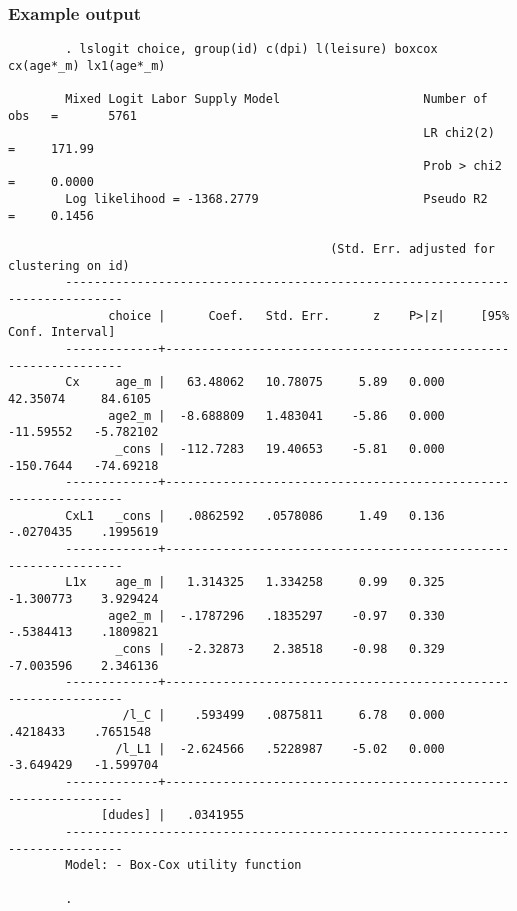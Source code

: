 \documentclass[handout,intlimits]{beamer}
\begin{document}
\begin{frame}[fragile]
\frametitle{Example output}
\begin{center}
	\tiny
	\begin{verbatim}
        . lslogit choice, group(id) c(dpi) l(leisure) boxcox cx(age*_m) lx1(age*_m)

        Mixed Logit Labor Supply Model                    Number of obs   =       5761
                                                          LR chi2(2)      =     171.99
                                                          Prob > chi2     =     0.0000
        Log likelihood = -1368.2779                       Pseudo R2       =     0.1456

                                             (Std. Err. adjusted for clustering on id)
        ------------------------------------------------------------------------------
              choice |      Coef.   Std. Err.      z    P>|z|     [95% Conf. Interval]
        -------------+----------------------------------------------------------------
        Cx     age_m |   63.48062   10.78075     5.89   0.000     42.35074     84.6105
              age2_m |  -8.688809   1.483041    -5.86   0.000    -11.59552   -5.782102
               _cons |  -112.7283   19.40653    -5.81   0.000    -150.7644   -74.69218
        -------------+----------------------------------------------------------------
        CxL1   _cons |   .0862592   .0578086     1.49   0.136    -.0270435    .1995619
        -------------+----------------------------------------------------------------
        L1x    age_m |   1.314325   1.334258     0.99   0.325    -1.300773    3.929424
              age2_m |  -.1787296   .1835297    -0.97   0.330    -.5384413    .1809821
               _cons |   -2.32873    2.38518    -0.98   0.329    -7.003596    2.346136
        -------------+----------------------------------------------------------------
                /l_C |    .593499   .0875811     6.78   0.000     .4218433    .7651548
               /l_L1 |  -2.624566   .5228987    -5.02   0.000    -3.649429   -1.599704
        -------------+----------------------------------------------------------------
             [dudes] |   .0341955
        ------------------------------------------------------------------------------
        Model: - Box-Cox utility function
        
        .
	\end{verbatim}
\end{center}
\end{frame}
\end{document}
